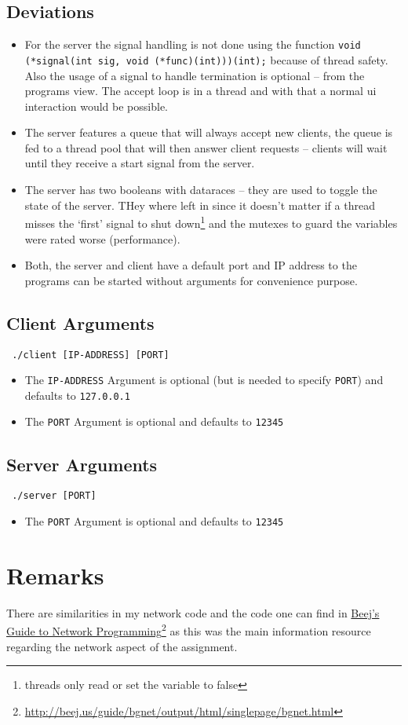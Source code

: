 \documentclass[english,a4paper,12pt]{scrartcl}
\newcommand\fnurl[2]{
  \href{#2}{#1}\footnote{\url{#2}}
}
\begin{document}
  \subsection{Deviations}
    \begin{itemize}[itemsep=5pt,topsep=0pt,parsep=0pt,partopsep=0pt]
      \item
        For the server the signal handling is not done using the function \linebreak \texttt{void (*signal(int sig, void (*func)(int)))(int);}  because of thread safety. Also the usage of a signal to handle termination is optional -- from the programs view. The accept loop is in a thread and with that a normal ui interaction would be possible.
      \item
        The server features a queue that will always accept new clients, the queue is fed to a thread pool that will then answer client requests -- clients will wait until they receive a start signal from the server.
      \item
        The server has two booleans with dataraces -- they are used to toggle the state of the server. THey where left in since it doesn't matter if a thread misses the `first' signal to shut down\footnote{threads only read or set the variable to false} and the mutexes to guard the variables were rated worse (performance).
      \item
        Both, the server and client have a default port and IP address to the programs can be started without arguments for convenience purpose.
    \end{itemize}

  \subsection{Client Arguments}
    \texttt{
      ./client [IP-ADDRESS] [PORT]
    }
    \begin{itemize}[itemsep=5pt,topsep=3pt,parsep=0pt,partopsep=0pt]
      \item[] The \texttt{IP-ADDRESS} Argument is optional (but is needed to specify \texttt{PORT}) and defaults to \texttt{127.0.0.1}
      \item[] The \texttt{PORT} Argument is optional and defaults to \texttt{12345}
    \end{itemize}
  \subsection{Server Arguments}
    \texttt{
      ./server [PORT]
    }
    \begin{itemize}[itemsep=5pt,topsep=3pt,parsep=0pt,partopsep=0pt]
      \item[] The \texttt{PORT} Argument is optional and defaults to \texttt{12345}
    \end{itemize}

\section{Remarks}
  There are similarities in my network code and the code one can find in \fnurl{Beej's Guide to Network Programming}{http://beej.us/guide/bgnet/output/html/singlepage/bgnet.html} as this was the main information resource regarding the network aspect of the assignment.
\end{document}
